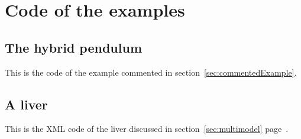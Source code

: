 \section{Code of the examples}
\subsection{The hybrid pendulum}\label{cpp:hybrid}
This is the code of the example commented in section~\ref{sec:commentedExample}.

\subsection{A liver}\label{xml:liver}
This is the XML code of the liver discussed in section~\ref{sec:multimodel} page~\pageref{bla:liver}.

% 
% 
% 
% 
% 
% 
% 








